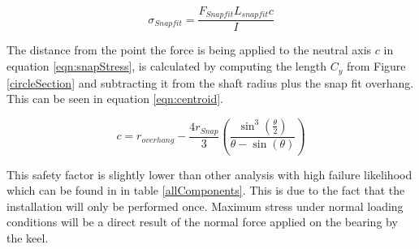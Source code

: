\documentclass[../main.tex]{subfiles}
\begin{document}
\begin{equation}
\label{eqn:snapStress}
\sigma_{Snapfit} = \frac{F_{Snapfit} L_{snapfit} c}{I}
\end{equation}

The distance from the point the force is being applied to the neutral axis $c$ in equation \ref{eqn:snapStress}, is calculated by computing the length $C_y$ from Figure \ref{circleSection} and subtracting it from the shaft radius plus the snap fit overhang. This can be seen in equation \ref{eqn:centroid}. 

 \begin{equation}
 \label{eqn:centroid}
 c = r_{overhang} - \frac{4r_{Snap}}{3}\left(\frac{\sin^3\left(\frac{\theta}{2}\right)} {\theta-\sin(\theta)}\right)
 \end{equation}

 This safety factor is slightly lower than other analysis with high failure likelihood which can be found in in table \ref{allComponents}. This is due to the fact that the installation will only be performed once. Maximum stress under normal loading conditions will be a direct result of the normal force applied on the bearing by the keel.
\end{document}
